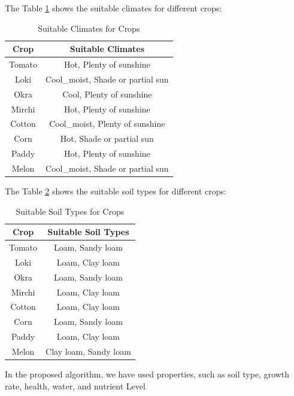 \documentclass[conference]{IEEEtran}
\begin{document}
The Table \ref{1} shows the suitable climates for different crops:
\begin{table}[H]
  \centering
    \caption{Suitable Climates for Crops}
  \begin{tabular}{|c|c|}
    \hline
    \textbf{Crop} & \textbf{Suitable Climates} \\
    \hline
    Tomato & Hot, Plenty of sunshine \\
    Loki & Cool\_moist, Shade or partial sun \\
    Okra & Cool, Plenty of sunshine \\
    Mirchi & Hot, Plenty of sunshine \\
    Cotton & Cool\_moist, Plenty of sunshine \\
    Corn & Hot, Shade or partial sun \\
    Paddy & Hot, Plenty of sunshine \\
    Melon & Cool\_moist, Shade or partial sun \\
    \hline
  \end{tabular}
  \label{1}
\end{table}
The Table \ref{2} shows the suitable soil types for different crops:
\begin{table}[H]
  \centering
    \caption{Suitable Soil Types for Crops}
  \begin{tabular}{|c|c|}
    \hline
    \textbf{Crop} & \textbf{Suitable Soil Types} \\
    \hline
    Tomato & Loam, Sandy loam \\
    Loki & Loam, Clay loam \\
    Okra & Loam, Sandy loam \\
    Mirchi & Loam, Clay loam \\
    Cotton & Loam, Clay loam \\
    Corn & Loam, Sandy loam \\
    Paddy & Loam, Clay loam \\
    Melon & Clay loam, Sandy loam \\
    \hline
  \end{tabular}
  \label{2}
\end{table}

In the proposed algorithm, we have used properties, such as soil type, growth rate, health, water, and nutrient Level
\end{document}
